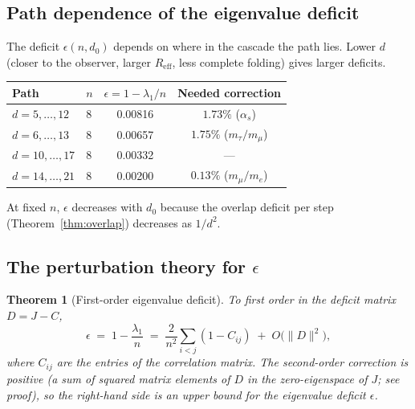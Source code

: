 \documentclass[12pt,a4paper]{article}
\newtheorem{theorem}{Theorem}[section]
\theoremstyle{remark}
\begin{document}
\subsection{Path dependence of the eigenvalue deficit}

The deficit $\epsilon(n, d_0)$ depends on where in the cascade the path lies. Lower $d$ (closer to the observer, larger $R_{\mathrm{eff}}$, less complete folding) gives larger deficits.

\begin{center}
\renewcommand{\arraystretch}{1.2}
\begin{tabular}{llcc}
\toprule
Path & $n$ & $\epsilon = 1 - \lambda_1/n$ & Needed correction \\
\midrule
$d = 5, \ldots, 12$ & 8 & 0.00816 & $1.73\%$ ($\alpha_s$) \\
$d = 6, \ldots, 13$ & 8 & 0.00657 & $1.75\%$ ($m_\tau/m_\mu$) \\
$d = 10, \ldots, 17$ & 8 & 0.00332 & --- \\
$d = 14, \ldots, 21$ & 8 & 0.00200 & $0.13\%$ ($m_\mu/m_e$) \\
\bottomrule
\end{tabular}
\end{center}

\noindent At fixed $n$, $\epsilon$ decreases with $d_0$ because the overlap deficit per step (Theorem~\ref{thm:overlap}) decreases as $1/d^2$.

\subsection{The perturbation theory for $\epsilon$}\label{sec:perturbation}

\begin{theorem}[First-order eigenvalue deficit]\label{thm:pert}
To first order in the deficit matrix $D = J - C$,
\[
\epsilon \;=\; 1 - \frac{\lambda_1}{n} \;=\; \frac{2}{n^2} \sum_{i < j} \left(1 - C_{ij}\right) \;+\; O\!\bigl(\|D\|^2\bigr),
\]
where $C_{ij}$ are the entries of the correlation matrix. The second-order correction is \emph{positive} (a sum of squared matrix elements of $D$ in the zero-eigenspace of $J$; see proof), so the right-hand side is an \emph{upper bound} for the eigenvalue deficit $\epsilon$.
\end{theorem}
\end{document}
